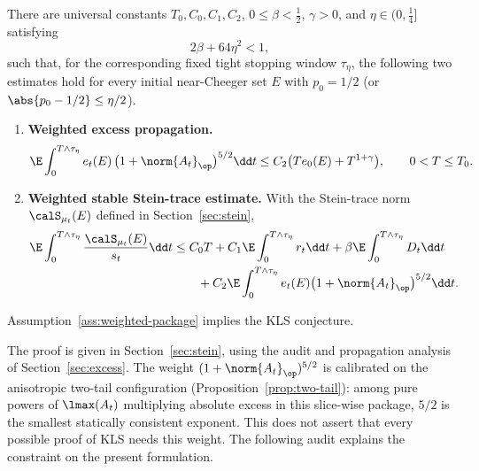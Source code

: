 \documentclass[../../main.tex]{subfiles}
\begin{document}
\begin{assumption}
\label{ass:weighted-package}
There are universal constants $T_0,C_0,C_1,C_2$, $0\le\beta<\tfrac12$, $\gamma>0$, and
$\eta\in(0,\tfrac14]$ satisfying
\begin{equation}\label{eq:weighted-absorption-margin}
  2\beta+64\eta^2<1,
\end{equation}
such that, for the corresponding fixed tight stopping window $\tau_\eta$, the following two
estimates hold for every initial
near-Cheeger set $E$ with $p_0=1/2$ (or $\abs{p_0-1/2}\le\eta/2$).

\begin{enumerate}[label=(\roman*-w),leftmargin=3.2em]
  \item \textbf{Weighted excess propagation.}
  \begin{equation}\label{eq:intro-weighted-excess}
    \E\int_0^{T\wedge\tau_\eta} e_t(E)\,\bigl(1+\norm{A_t}_\op\bigr)^{5/2}\dd t
    \le C_2\bigl(T e_0(E)+T^{1+\gamma}\bigr),
    \qquad 0<T\le T_0 .
  \end{equation}

	  \item \textbf{Weighted stable Stein-trace estimate.}  With the Stein-trace norm
	  $\calS_{\mu_t}(E)$ defined in Section~\ref{sec:stein},
	  \begin{equation}\label{eq:intro-weighted-stein}
	  \begin{aligned}
	    \E\int_0^{T\wedge\tau_\eta}\frac{\calS_{\mu_t}(E)}{s_t}\dd t
	    &\le
	    C_0T+C_1\E\int_0^{T\wedge\tau_\eta}r_t\dd t
	    +\beta\E\int_0^{T\wedge\tau_\eta}D_t\dd t \\
	    &\qquad
	    +C_2\E\int_0^{T\wedge\tau_\eta}
	    e_t(E)\bigl(1+\norm{A_t}_\op\bigr)^{5/2}\dd t .
	  \end{aligned}
	  \end{equation}
\end{enumerate}
\end{assumption}

\begin{theorem}
\label{thm:intro-weighted}
Assumption~\ref{ass:weighted-package} implies the KLS conjecture.
\end{theorem}

The proof is given in Section~\ref{sec:stein}, using the audit and propagation analysis of
Section~\ref{sec:excess}. The weight $(1+\norm{A_t}_\op)^{5/2}$ is calibrated on the anisotropic
two-tail configuration (Proposition~\ref{prop:two-tail}): among pure powers of $\lmax(A_t)$
multiplying absolute excess in this slice-wise package, $5/2$ is the smallest statically
consistent exponent. This does not assert that every possible proof of KLS needs this weight.
The following audit explains the constraint on the present formulation.
\end{document}
